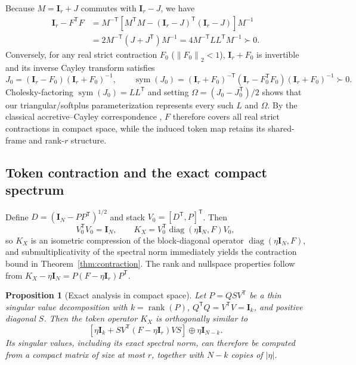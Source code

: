 \documentclass[10pt,twocolumn]{article}
\newtheorem{proposition}[theorem]{Proposition}
\newcommand{\I}{\mathbf{I}}
\newcommand{\T}{\mathsf{T}}
\newcommand{\norm}[1]{\left\lVert #1 \right\rVert}
\newcommand{\rank}{\operatorname{rank}}
\newcommand{\sym}{\operatorname{sym}}
\newcommand{\diag}{\operatorname{diag}}
\begin{document}
Because $M=\I_r+J$ commutes with $\I_r-J$, we have
\begin{align}
 \I_r-F^\T F
 &=M^{-\T}\left[M^\T M-(\I_r-J)^\T(\I_r-J)\right]M^{-1}\\
 &=2M^{-\T}(J+J^\T)M^{-1}
 =4M^{-\T}LL^\T M^{-1}\succ0.
\end{align}
Conversely, for any real strict contraction $F_0$ ($\norm{F_0}_2<1$),
$\I_r+F_0$ is invertible and its inverse Cayley transform satisfies
\begin{equation}
 J_0=(\I_r-F_0)(\I_r+F_0)^{-1},\qquad
 \sym(J_0)=(\I_r+F_0)^{-\T}(\I_r-F_0^\T F_0)(\I_r+F_0)^{-1}\succ0.
\end{equation}
Cholesky-factoring $\sym(J_0)=LL^\T$ and setting $\Omega=(J_0-J_0^\T)/2$ shows
that our triangular/softplus parameterization represents every such $L$ and
$\Omega$.
By the classical accretive--Cayley correspondence
\cite{bauschke2017convex,wang2023direct}, $F$ therefore covers all real strict
contractions in compact space, while the induced token map retains its
shared-frame and rank-$r$ structure.

\subsection{Token contraction and the exact compact spectrum}
\label{app:spectrum}

Define $D=(\I_N-PP^\T)^{1/2}$ and stack $V_0=[D^\T,P]^\T$. Then
\begin{equation}
 V_0^\T V_0=\I_N,\qquad K_X=V_0^\T\diag(\eta\I_N,F)V_0,
 \label{eq:readout-compression}
\end{equation}
so $K_X$ is an isometric compression of the block-diagonal operator
$\diag(\eta\I_N,F)$, and submultiplicativity of the spectral norm immediately
yields the contraction bound in Theorem~\ref{thm:contraction}.
The rank and nullspace properties follow from
$K_X-\eta\I_N=P(F-\eta\I_r)P^\T$.

\begin{proposition}[Exact analysis in compact space]
\label{prop:spectrum}
Let $P=Q S V^\T$ be a thin singular value decomposition with
$k=\rank(P)$, $Q^\T Q=V^\T V=\I_k$, and positive diagonal $S$.
Then the token operator $K_X$ is orthogonally similar to
\begin{equation}
 \left[\eta\I_k+S V^\T(F-\eta\I_r)V S\right]
       \oplus\eta\I_{N-k}.
 \label{eq:certificate}
\end{equation}
Its singular values, including its exact spectral norm, can therefore be
computed from a compact matrix of size at most $r$, together with $N-k$
copies of $|\eta|$.
\end{proposition}
\end{document}
